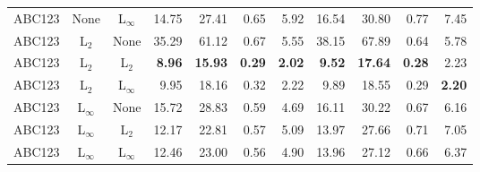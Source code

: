 \begin{tabular}{lccrrrrrrrr}
ABC123   & None  & L$_\infty$ & 14.75 & 27.41 & 0.65 & 5.92 & 16.54 & 30.80 & 0.77 & 7.45\vspace{1.5mm}\\
ABC123  & L$_2$ & None & 35.29 & 61.12 & 0.67 & 5.55 & 38.15 & 67.89 &  0.64 &  5.78 \\
ABC123  & L$_2$ & L$_2$ & \textbf{8.96} & \textbf{15.93} & \textbf{0.29} & \textbf{2.02} & \textbf{9.52} & \textbf{17.64} & \textbf{0.28} & 2.23\\
ABC123  & L$_2$ & L$_\infty$ & 9.95 & 18.16 & 0.32 & 2.22 & 9.89 & 18.55 & 0.29 & \textbf{2.20}\vspace{1.5mm}\\
ABC123  & L$_\infty$ & None & 15.72 & 28.83 & 0.59 & 4.69 & 16.11 & 30.22 & 0.67 & 6.16\\
ABC123   & L$_\infty$  & L$_2$ & 12.17 & 22.81 & 0.57 & 5.09 & 13.97 & 27.66 & 0.71 & 7.05 \\
ABC123   & L$_\infty$  & L$_\infty$ & 12.46 & 23.00 & 0.56 & 4.90 & 13.96 & 27.12 & 0.66 & 6.37\\

   
   \bottomrule
   \end{tabular}
   
